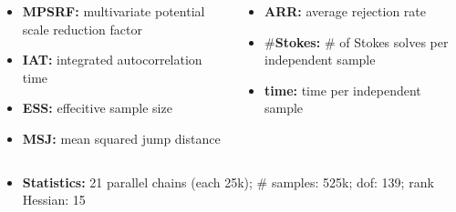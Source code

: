 \documentclass[10pt,final,xcolor=dvipsnames]{beamer}
\begin{document}
\begin{frame}
	\begin{columns}
		\begin{column}{0.45\columnwidth}
			\begin{itemize}
				\item {\bfseries MPSRF:} multivariate potential scale reduction factor
				\vspace{-0.02in}
				\item {\bfseries IAT:} integrated autocorrelation time
				\vspace{-0.02in}
				\item {\bfseries ESS:} effecitive sample size
				\vspace{-0.02in}
				\item {\bfseries MSJ:} mean squared jump distance
			\end{itemize}
		\end{column}
		\begin{column}{0.45\columnwidth}
			\begin{itemize}
				\item {\bfseries ARR:} average rejection rate
				\vspace{-0.02in}
				\item {\bfseries $\#$Stokes:} $\#$ of Stokes solves per independent sample
				\vspace{-0.02in}
				\item {\bfseries time:} time per independent sample
			\end{itemize}
		\end{column}
	\end{columns}
	
	\begin{columns}
		\hspace{0.26in}
		\begin{column}{0.95\columnwidth}
			\begin{itemize}
				\item {\bfseries Statistics:} 21 parallel chains (each 25k); $\#$
				samples: 525k; dof: 139; rank Hessian: 15
			\end{itemize}
		\end{column}
		\begin{column}{0.5\columnwidth}
		\end{column}
	\end{columns}
	
	\vspace{0.05in}
	

\end{frame}
\end{document}

